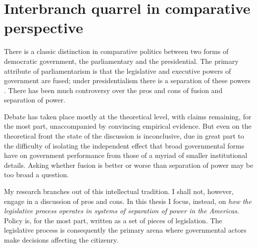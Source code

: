  
\chapter{Interbranch quarrel in comparative perspective}
\label{ch:sopInPerspective}


There is a classic distinction in comparative politics between two forms of democratic government, the parliamentary and the presidential.  The primary attribute of parliamentarism is that the legislative and executive powers of government are fused; under presidentialism there is a separation of these powers \citep{lijphart.1984}. There has been much controversy over the pros and cons of fusion and separation of power.  

Debate has taken place mostly at the theoretical level, with claims remaining, for the most part, unaccompanied by convincing empirical evidence.  But even on the theoretical front the state of the discussion is inconclusive, due in great part to the difficulty of isolating the independent effect that broad governmental forms have on government performance from those of a myriad of smaller institutional details.  Asking whether fusion is better or worse than separation of power may be too broad a question.  

My research branches out of this intellectual tradition.  I shall not, however, engage in a discussion of pros and cons.  In this thesis I focus, instead, on \emph{how the legislative process operates in systems of separation of power in the Americas}.  Policy is, for the most part, written as a set of pieces of legislation.  The legislative process is consequently the primary arena where governmental actors make decisions affecting the citizenry.  

